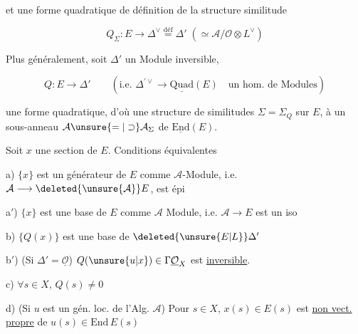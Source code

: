 
et une  forme quadratique de définition de la structure   similitude

\[
Q_\Sigma:E\longrightarrow\Delta^\vee\overset{\mathrm{déf}}{=}\Delta' \;(\simeq\mathcal A/\mathcal O\otimes L^\vee)
\]

 Plus généralement, soit $\Delta'$ un Module inversible,

\[
Q:E\longrightarrow\Delta'\qquad(\text{i.e. }\Delta^{\prime\vee}\longrightarrow\underline{\mathrm{Quad}}(E)\quad\text{un hom. de Modules})
\]

une forme quadratique, d'où une structure de similitudes $\Sigma=\Sigma_Q$ sur $E$,  à un sous-anneau $\mathcal A\unsure{=|\supset}\mathcal A_\Sigma$ de $\underline{\mathrm{End}}(E)$.

Soit $x$ une section de $E$. Conditions équivalentes

a) $\{x\}$ est un générateur de $E$ comme $\mathcal A$-Module, i.e.  $\mathcal A\longrightarrow\deleted{\unsure{\mathcal A}}E$, est épi

a$'$)  $\{x\}$ est une base de $E$ comme $\mathcal A$ Module, i.e.  $\mathcal A\longrightarrow E$ est un iso

b) $\{Q(x)\}$ est une base de $\deleted{\unsure{E|L}}\Delta'$

b$'$) (Si $\Delta'=\underline{\mathcal O}$) $Q(\unsure{u|x})\in\Gamma\underline{\mathcal O}_X$ est \uline{inversible}.

c) $\forall s\in X$, $Q(s)\ne0$


d) (Si $u$ est un gén. loc. de l'Alg. $\mathcal A$) Pour  $s\in X$, $x(s)\in E(s)$ est \uline{non vect.} \uline{propre} de $u(s)\in\mathrm{End}\,E(s)$
